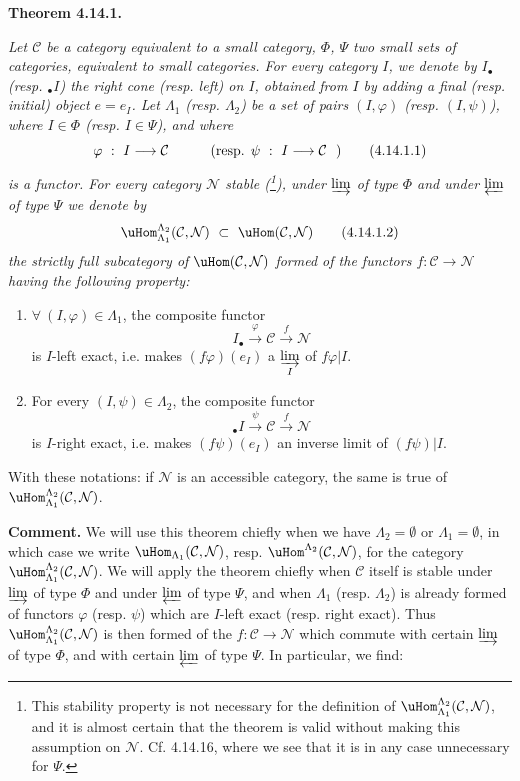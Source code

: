 \noindent\textbf{Theorem 4.14.1.} {\itshape Let $\mathcal{C}$ be a category equivalent to a small category, $\Phi$, $\Psi$ two small sets of categories, equivalent to small categories. For every category $I$, we denote by $I_{\bullet}$ (resp. ${}_{\bullet}I$) the right cone (resp. left) on $I$, obtained from $I$ by adding a final (resp. initial) object $e=e_I$. Let $\Lambda_1$ (resp. $\Lambda_2$) be a set of pairs $(I,\varphi)$ (resp. $(I,\psi)$), where $I\in\Phi$ (resp. $I\in\Psi$), and where
\[
\varphi\ :\ I \longrightarrow \mathcal{C} \qquad\quad \text{(resp. }\psi\ :\ I \longrightarrow \mathcal{C}\ \ \text{)} \tag*{\textup{(4.14.1.1)}}
\]
is a functor. For every category $\mathcal{N}$ stable (\footnote[163]{This stability property is not necessary for the definition of $\uHom^{\Lambda_2}_{\Lambda_1}(\mathcal{C},\mathcal{N})$, and it is almost certain that the theorem is valid without making this assumption on $\mathcal{N}$. Cf. 4.14.16, where we see that it is in any case unnecessary for $\Psi$.}), under $\varinjlim$ of type $\Phi$ and under $\varprojlim$ of type $\Psi$ we denote by
\[
\uHom^{\Lambda_2}_{\Lambda_1}(\mathcal{C},\mathcal{N})\ \subset\ \uHom(\mathcal{C},\mathcal{N}) \tag*{\textup{(4.14.1.2)}}
\]
the strictly full subcategory of $\uHom(\mathcal{C},\mathcal{N})$ formed of the functors $f:\mathcal{C}\longrightarrow\mathcal{N}$ having the following property:
\begin{enumerate}[leftmargin=2.5em]
\item[\textit{a)}] $\forall\ (I,\varphi)\in\Lambda_1$, the composite functor
\[
I_{\bullet} \xrightarrow{\ \varphi\ } \mathcal{C} \xrightarrow{\ f\ } \mathcal{N}
\]
is $I$-left exact, i.e. makes $(f\varphi)(e_I)$ a $\varinjlim\limits_{I}$ of $f\varphi|I$.
\item[\textit{b)}] For every $(I,\psi)\in\Lambda_2$, the composite functor
\[
{}_{\bullet}I \xrightarrow{\ \psi\ } \mathcal{C} \xrightarrow{\ f\ } \mathcal{N}
\]
is $I$-right exact, i.e. makes $(f\psi)(e_I)$ an inverse limit of $(f\psi)|I$.
\end{enumerate}
\noindent With these notations: if $\mathcal{N}$ is an accessible category, the same is true of $\uHom^{\Lambda_2}_{\Lambda_1}(\mathcal{C},\mathcal{N})$.}

\noindent\textbf{Comment.} We will use this theorem chiefly when we have $\Lambda_2=\emptyset$ or $\Lambda_1=\emptyset$, in which case we write $\uHom_{\Lambda_1}(\mathcal{C},\mathcal{N})$, resp. $\uHom^{\Lambda_2}(\mathcal{C},\mathcal{N})$, for the category $\uHom^{\Lambda_2}_{\Lambda_1}(\mathcal{C},\mathcal{N})$. We will apply the theorem chiefly when $\mathcal{C}$ itself is stable under $\varinjlim$ of type $\Phi$ and under $\varprojlim$ of type $\Psi$, and when $\Lambda_1$ (resp. $\Lambda_2$) is already formed of functors $\varphi$ (resp. $\psi$) which are $I$-left exact (resp. right exact). Thus $\uHom^{\Lambda_2}_{\Lambda_1}(\mathcal{C},\mathcal{N})$ is then formed of the $f:\mathcal{C}\longrightarrow\mathcal{N}$ which commute with certain $\varinjlim$ of type $\Phi$, and with certain $\varprojlim$ of type $\Psi$. In particular, we find:

